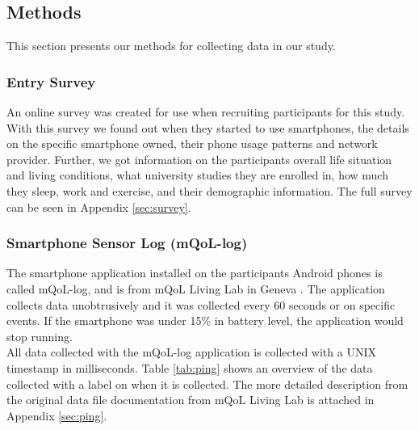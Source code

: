 \documentclass[12pt]{article} %
\begin{document}
\subsection{Methods}
This section presents our methods for collecting data in our study. 

\subsubsection{Entry Survey}
An online survey was created for use when recruiting participants for this study. With this survey we found out when they started to use smartphones, the details on the specific smartphone owned, their phone usage patterns and network provider. Further, we got information on the participants overall life situation and living conditions, what university studies they are enrolled in, how much they sleep, work and exercise, and their demographic information. The full survey can be seen in Appendix \ref{sec:survey}. 

\subsubsection{Smartphone Sensor Log (mQoL-log)}
The smartphone application installed on the participants Android phones is called mQoL-log, and is from mQoL Living Lab in Geneva \cite{mQOL}. The application collects data unobtrusively and it was collected every 60 seconds or on specific events. If the smartphone was under 15\% in battery level, the application would stop running. \\

All data collected with the mQoL-log application is collected with a UNIX timestamp in milliseconds. Table \ref{tab:ping} shows an overview of the data collected with a label on when it is collected. The more detailed description from the original data file documentation from mQoL Living Lab is attached in Appendix \ref{sec:ping}. 
\end{document}

